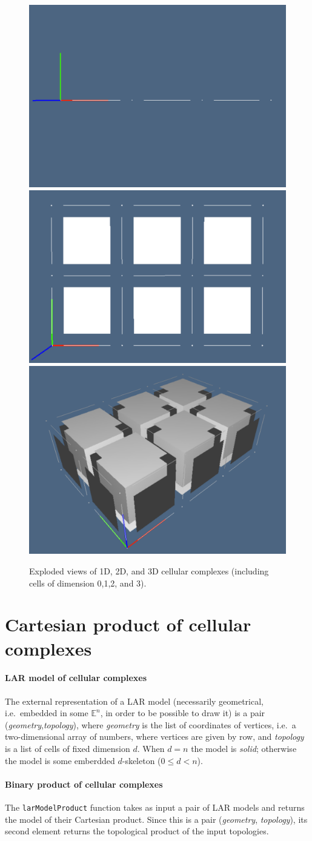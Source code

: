 \documentclass[11pt,oneside]{article}	%
\def\E{\mathbb{E}}
\begin{document}
\begin{figure}[htbp] %
   \centering
   \includegraphics[width=0.313\linewidth]{images/complex3} 
   \includegraphics[width=0.33\linewidth]{images/complex32} 
   \includegraphics[width=0.305\linewidth]{images/complex321} 
   \caption{Exploded views of 1D, 2D, and 3D cellular complexes (including cells of dimension 0,1,2, and 3).}
   \label{fig:grid23D}
\end{figure}

\section{Cartesian product of cellular complexes}
\label{sec:product}

\paragraph{LAR model of cellular complexes}

The external representation of a LAR model (necessarily geometrical, i.e.~embedded in some $\E^n$, in order to be possible to draw it) is a pair (\emph{geometry},\emph{topology}), where \emph{geometry} is the list of coordinates of vertices, i.e.~a two-dimensional array of numbers, where vertices are given by row, and \emph{topology} is a list of cells of fixed dimension $d$. When $d=n$ the model is \emph{solid}; otherwise  the model is some emberdded $d$-skeleton ($0\leq d <n$).

\paragraph{Binary product of cellular complexes}
The \texttt{larModelProduct} function takes as input a pair of LAR models and returns the model of their Cartesian product. Since this is a pair (\emph{geometry}, \emph{topology}), its second element returns the topological product of the input topologies.
\end{document}
